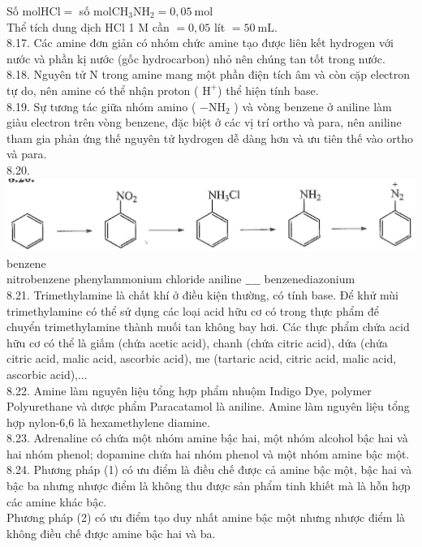 \documentclass[10pt]{article}
\begin{document}
Số $\mathrm{mol} \mathrm{HCl}=$ số $\mathrm{mol} \mathrm{CH}_{3} \mathrm{NH}_{2}=0,05 \mathrm{~mol}$\\
Thể tích dung dịch HCl 1 M cần $=0,05$ lít $=50 \mathrm{~mL}$.\\
8.17. Các amine đơn giản có nhóm chức amine tạo được liên kết hydrogen với nước và phần kị nước (gốc hydrocarbon) nhỏ nên chúng tan tốt trong nước.\\
8.18. Nguyên tử N trong amine mang một phần điện tích âm và còn cặp electron tự do, nên amine có thể nhận proton ( $\mathrm{H}^{+}$) thể hiện tính base.\\
8.19. Sự tương tác giữa nhóm amino ( $-\mathrm{NH}_{2}$ ) và vòng benzene ở aniline làm giàu electron trên vòng benzene, đặc biệt ở các vị trí ortho và para, nên aniline tham gia phản ứng thế nguyên tử hydrogen dễ dàng hơn và ưu tiên thế vào ortho và para.\\
8.20.\\
\includegraphics[max width=\textwidth, center]{2025_10_23_b82d44049ffb48e891e8g-11}\\
benzene\\
nitrobenzene phenylammonium chloride aniline $\_\_\_\_$ benzenediazonium\\
8.21. Trimethylamine là chất khí ở điều kiện thường, có tính base. Để khử mùi trimethylamine có thể sử dụng các loại acid hữu cơ có trong thực phẩm để chuyển trimethylamine thành muối tan không bay hơi. Các thực phẩm chứa acid hữu cơ có thể là giấm (chứa acetic acid), chanh (chứa citric acid), dứa (chứa citric acid, malic acid, ascorbic acid), me (tartaric acid, citric acid, malic acid, ascorbic acid),...\\
8.22. Amine làm nguyên liệu tổng hợp phẩm nhuộm Indigo Dye, polymer Polyurethane và dược phẩm Paracatamol là aniline. Amine làm nguyên liệu tổng hợp nylon-6,6 là hexamethylene diamine.\\
8.23. Adrenaline có chứa một nhóm amine bậc hai, một nhóm alcohol bậc hai và hai nhóm phenol; dopamine chứa hai nhóm phenol và một nhóm amine bậc một.\\
8.24. Phương pháp (1) có ưu điểm là điều chế được cả amine bậc một, bậc hai và bậc ba nhưng nhược điểm là không thu được sản phẩm tinh khiết mà là hỗn hợp các amine khác bậc.\\
Phương pháp (2) có ưu điểm tạo duy nhất amine bậc một nhưng nhược điểm là không điều chế được amine bậc hai và ba.
\end{document}
